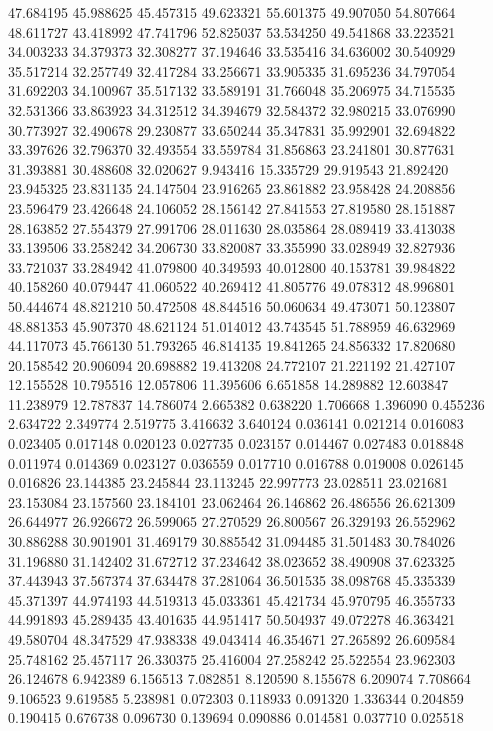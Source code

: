 47.684195
45.988625
45.457315
49.623321
55.601375
49.907050
54.807664
48.611727
43.418992
47.741796
52.825037
53.534250
49.541868
33.223521
34.003233
34.379373
32.308277
37.194646
33.535416
34.636002
30.540929
35.517214
32.257749
32.417284
33.256671
33.905335
31.695236
34.797054
31.692203
34.100967
35.517132
33.589191
31.766048
35.206975
34.715535
32.531366
33.863923
34.312512
34.394679
32.584372
32.980215
33.076990
30.773927
32.490678
29.230877
33.650244
35.347831
35.992901
32.694822
33.397626
32.796370
32.493554
33.559784
31.856863
23.241801
30.877631
31.393881
30.488608
32.020627
9.943416
15.335729
29.919543
21.892420
23.945325
23.831135
24.147504
23.916265
23.861882
23.958428
24.208856
23.596479
23.426648
24.106052
28.156142
27.841553
27.819580
28.151887
28.163852
27.554379
27.991706
28.011630
28.035864
28.089419
33.413038
33.139506
33.258242
34.206730
33.820087
33.355990
33.028949
32.827936
33.721037
33.284942
41.079800
40.349593
40.012800
40.153781
39.984822
40.158260
40.079447
41.060522
40.269412
41.805776
49.078312
48.996801
50.444674
48.821210
50.472508
48.844516
50.060634
49.473071
50.123807
48.881353
45.907370
48.621124
51.014012
43.743545
51.788959
46.632969
44.117073
45.766130
51.793265
46.814135
19.841265
24.856332
17.820680
20.158542
20.906094
20.698882
19.413208
24.772107
21.221192
21.427107
12.155528
10.795516
12.057806
11.395606
6.651858
14.289882
12.603847
11.238979
12.787837
14.786074
2.665382
0.638220
1.706668
1.396090
0.455236
2.634722
2.349774
2.519775
3.416632
3.640124
0.036141
0.021214
0.016083
0.023405
0.017148
0.020123
0.027735
0.023157
0.014467
0.027483
0.018848
0.011974
0.014369
0.023127
0.036559
0.017710
0.016788
0.019008
0.026145
0.016826
23.144385
23.245844
23.113245
22.997773
23.028511
23.021681
23.153084
23.157560
23.184101
23.062464
26.146862
26.486556
26.621309
26.644977
26.926672
26.599065
27.270529
26.800567
26.329193
26.552962
30.886288
30.901901
31.469179
30.885542
31.094485
31.501483
30.784026
31.196880
31.142402
31.672712
37.234642
38.023652
38.490908
37.623325
37.443943
37.567374
37.634478
37.281064
36.501535
38.098768
45.335339
45.371397
44.974193
44.519313
45.033361
45.421734
45.970795
46.355733
44.991893
45.289435
43.401635
44.951417
50.504937
49.072278
46.363421
49.580704
48.347529
47.938338
49.043414
46.354671
27.265892
26.609584
25.748162
25.457117
26.330375
25.416004
27.258242
25.522554
23.962303
26.124678
6.942389
6.156513
7.082851
8.120590
8.155678
6.209074
7.708664
9.106523
9.619585
5.238981
0.072303
0.118933
0.091320
1.336344
0.204859
0.190415
0.676738
0.096730
0.139694
0.090886
0.014581
0.037710
0.025518

